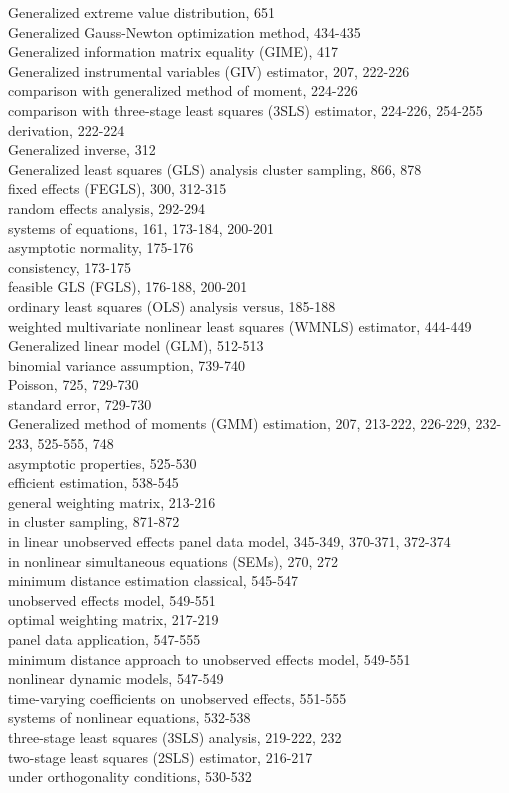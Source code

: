 \documentclass[10pt]{article}
\begin{document}
Generalized extreme value distribution, 651\\
Generalized Gauss-Newton optimization method, 434-435\\
Generalized information matrix equality (GIME), 417\\
Generalized instrumental variables (GIV) estimator, 207, 222-226\\
comparison with generalized method of moment, 224-226\\
comparison with three-stage least squares (3SLS) estimator, 224-226, 254-255\\
derivation, 222-224\\
Generalized inverse, 312\\
Generalized least squares (GLS) analysis cluster sampling, 866, 878\\
fixed effects (FEGLS), 300, 312-315\\
random effects analysis, 292-294\\
systems of equations, 161, 173-184, 200-201\\
asymptotic normality, 175-176\\
consistency, 173-175\\
feasible GLS (FGLS), 176-188, 200-201\\
ordinary least squares (OLS) analysis versus, 185-188\\
weighted multivariate nonlinear least squares (WMNLS) estimator, 444-449\\
Generalized linear model (GLM), 512-513\\
binomial variance assumption, 739-740\\
Poisson, 725, 729-730\\
standard error, 729-730\\
Generalized method of moments (GMM) estimation, 207, 213-222, 226-229, 232-233, 525-555, 748\\
asymptotic properties, 525-530\\
efficient estimation, 538-545\\
general weighting matrix, 213-216\\
in cluster sampling, 871-872\\
in linear unobserved effects panel data model, 345-349, 370-371, 372-374\\
in nonlinear simultaneous equations (SEMs), 270, 272\\
minimum distance estimation classical, 545-547\\
unobserved effects model, 549-551\\
optimal weighting matrix, 217-219\\
panel data application, 547-555\\
minimum distance approach to unobserved effects model, 549-551\\
nonlinear dynamic models, 547-549\\
time-varying coefficients on unobserved effects, 551-555\\
systems of nonlinear equations, 532-538\\
three-stage least squares (3SLS) analysis, 219-222, 232\\
two-stage least squares (2SLS) estimator, 216-217\\
under orthogonality conditions, 530-532
\end{document}
